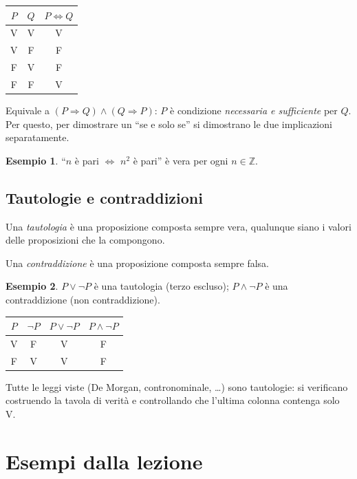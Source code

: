 \documentclass[11pt,a4paper]{article}
\theoremstyle{definition}
\newtheorem*{esempio}{Esempio}
\newcommand{\V}{\textsf{V}}
\newcommand{\F}{\textsf{F}}
\begin{document}
\begin{center}
\begin{tabular}{cc|c}
$P$ & $Q$ & $P \Leftrightarrow Q$ \\ \hline
\V & \V & \V \\
\V & \F & \F \\
\F & \V & \F \\
\F & \F & \V
\end{tabular}
\end{center}

Equivale a $(P \Rightarrow Q) \land (Q \Rightarrow P)$: $P$ è condizione
\emph{necessaria e sufficiente} per $Q$. Per questo, per dimostrare un
``se e solo se'' si dimostrano le due implicazioni separatamente.

\begin{esempio}
``$n$ è pari $\Leftrightarrow$ $n^2$ è pari'' è vera per ogni
$n \in \mathbb{Z}$.
\end{esempio}

\subsection{Tautologie e contraddizioni}

\begin{definizione}
Una \emph{tautologia} è una proposizione composta sempre vera, qualunque
siano i valori delle proposizioni che la compongono.

Una \emph{contraddizione} è una proposizione composta sempre falsa.
\end{definizione}

\begin{esempio}
$P \lor \neg P$ è una tautologia (terzo escluso);
$P \land \neg P$ è una contraddizione (non contraddizione).
\begin{center}
\begin{tabular}{c|c|c|c}
$P$ & $\neg P$ & $P \lor \neg P$ & $P \land \neg P$ \\ \hline
\V & \F & \V & \F \\
\F & \V & \V & \F
\end{tabular}
\end{center}
\end{esempio}

Tutte le leggi viste (De Morgan, contronominale, \dots) sono tautologie: si
verificano costruendo la tavola di verità e controllando che l'ultima
colonna contenga solo \V.


\section{Esempi dalla lezione}
\end{document}
